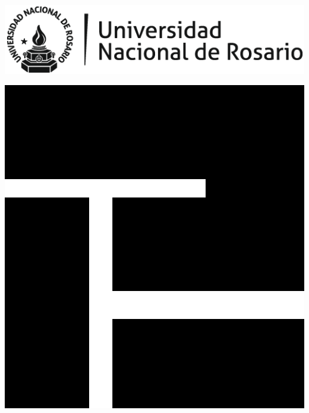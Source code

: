\documentclass[11pt]{article}
\begin{document}
\begin{large}
\begin{titlepage}

\newcommand{\HRule}{\rule{\linewidth}{0.5mm}} 							%
\noindent\begin{minipage}{0.3\textwidth}%
\includegraphics[scale=0.5]{img/Titulo/unr.png}
\end{minipage}%
\hfill%
\begin{minipage}{0.6\textwidth}\raggedleft
\includegraphics[scale=0.25]{img/Titulo/Logo IPS upscaled.png}
\end{minipage}

\vspace{5mm}

\hline

\vspace{7.5mm}


\end{titlepage}
\end{large}
\end{document}
